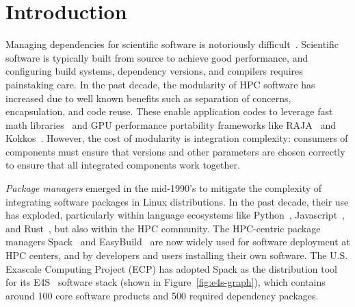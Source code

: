 \section{Introduction}
\label{sec:intro}



Managing dependencies for scientific software is notoriously
difficult~\cite{hoste+:pyhpc12,gamblin+:sc15,dubois2003johnny,hochstein+:2011-build}.
Scientific software is typically built from source to achieve good performance, and
configuring build systems, dependency versions, and compilers requires painstaking care.
In the past decade, the modularity of HPC software has increased due to well known
benefits such as separation of concerns, encapsulation, and code reuse. These enable
application codes to leverage fast math libraries~\cite{hypre,mfem,petsc,trilinos} and
GPU performance portability frameworks like RAJA~\cite{raja} and Kokkos~\cite{kokkos}.
However, the cost of modularity is integration complexity: consumers of components must
ensure that versions and other parameters are chosen correctly to ensure that all
integrated components work together.

{\it Package managers} emerged in the mid-1990's to mitigate the complexity of
integrating software packages in Linux distributions. In the past decade, their use has
exploded, particularly within language ecosystems like Python~\cite{pip},
Javascript~\cite{npm}, and Rust~\cite{cargo}, but also within the HPC community. The
HPC-centric package managers Spack~\cite{gamblin+:sc15} and
EasyBuild~\cite{hoste+:pyhpc12} are now widely used for software deployment at HPC
centers, and by developers and users installing their own software. The U.S. Exascale
Computing Project (ECP) has adopted Spack as the distribution tool for its
E4S~\cite{e4s} software stack (shown in Figure~\ref{fig:e4s-graph}), which contains
around 100 core software products and 500 required dependency packages.

